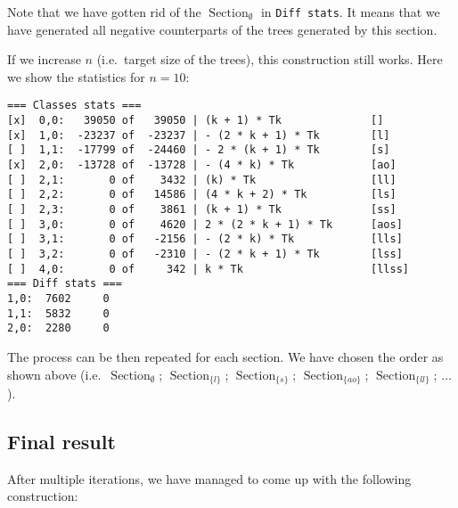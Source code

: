 \documentclass[final]{article}
\theoremstyle{definition}
\theoremstyle{definition}
\theoremstyle{remark}
\DeclareMathOperator{\tSection}{\text{Section}}
\begin{document}
Note that we have gotten rid of the \(\tSection_\emptyset\) in \verb|Diff stats|. It means that we have generated all negative counterparts of the trees generated by this section.

If we increase \(n\) (i.e.~target size of the trees), this construction still works. Here we show the statistics for \(n = 10\):

\begin{lstlisting}
=== Classes stats ===
[x]  0,0:   39050 of   39050 | (k + 1) * Tk              []
[x]  1,0:  -23237 of  -23237 | - (2 * k + 1) * Tk        [l]
[ ]  1,1:  -17799 of  -24460 | - 2 * (k + 1) * Tk        [s]
[x]  2,0:  -13728 of  -13728 | - (4 * k) * Tk            [ao]
[ ]  2,1:       0 of    3432 | (k) * Tk                  [ll]
[ ]  2,2:       0 of   14586 | (4 * k + 2) * Tk          [ls]
[ ]  2,3:       0 of    3861 | (k + 1) * Tk              [ss]
[ ]  3,0:       0 of    4620 | 2 * (2 * k + 1) * Tk      [aos]
[ ]  3,1:       0 of   -2156 | - (2 * k) * Tk            [lls]
[ ]  3,2:       0 of   -2310 | - (2 * k + 1) * Tk        [lss]
[ ]  4,0:       0 of     342 | k * Tk                    [llss]
=== Diff stats ===
1,0:  7602     0
1,1:  5832     0
2,0:  2280     0
\end{lstlisting}

The process can be then repeated for each section. We have chosen the order as shown above (i.e.~\(\tSection_\emptyset\); \(\tSection_{\{l\}}\); \(\tSection_{\{s\}}\); \(\tSection_{\{ao\}}\); \(\tSection_{\{ll\}}\); \(\ldots\)).

\subsection{Final result}%
\label{sub:final_result}

After multiple iterations, we have managed to come up with the following construction:
\end{document}
